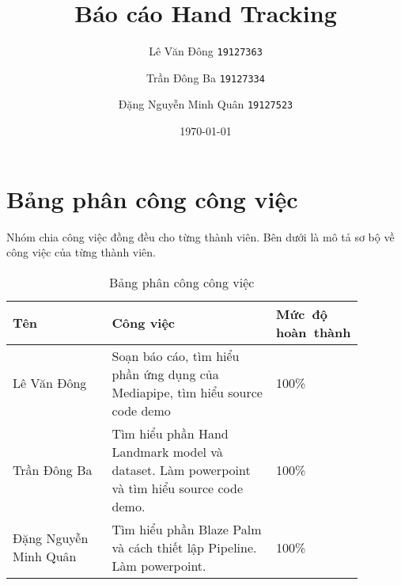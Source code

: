 \documentclass{article}
\title{Báo cáo Hand Tracking}
\author{Lê Văn Đông \texttt{19127363} \and Trần Đông Ba \texttt{19127334} \and Đặng Nguyễn Minh Quân \texttt{19127523}}
\date{\today}
\begin{document}
    



    \tableofcontents

    \newpage

    \section{Bảng phân công công việc}
    \label{sec:phancong}

    Nhóm chia công việc đồng đều cho từng thành viên. Bên dưới là mô tả sơ bộ về công việc của từng thành viên.


    \begin{table}[h]
        \centering
        \begin{tabular}{p{0.3\linewidth}|p{0.5\linewidth}|p{0.08\linewidth}} 
        Tên                   & Công việc                                                                                  & Mức~độ hoàn~thành \\\hline
        Lê Văn Đông           & Soạn báo cáo, tìm hiểu phần ứng dụng của Mediapipe, tìm hiểu source code demo              & 100\%             \\\hline
        Trần Đông Ba          & Tìm hiểu phần Hand Landmark model và dataset. Làm powerpoint và tìm hiểu source code demo. & 100\%             \\\hline
        Đặng Nguyễn Minh Quân & Tìm hiểu phần Blaze Palm và cách thiết lập Pipeline. Làm powerpoint.                       & 100\%            
        \end{tabular}
        \caption{Bảng phân công công việc}
    \end{table}
\end{document}
